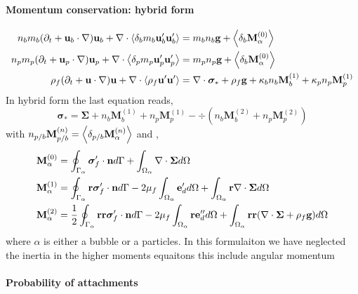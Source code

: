 \documentclass[12pt]{My_preprint}
\begin{document}
\paragraph*{Momentum conservation: hybrid form}
\begin{align}
    n_b m_b (\pddt + \textbf{u}_b\cdot  \grad) \textbf{u}_b
    + \div \pavg[b]{ m_b \textbf{u}_b' \textbf{u}_b'}
    &= 
    m_b n_b \textbf{g}
    + \pavg[b]{\textbf{M}^{(0)}_\alpha}
    \\
    n_p m_p (\pddt + \textbf{u}_p\cdot  \grad) \textbf{u}_p
    + \div \pavg{ m_p \textbf{u}_p' \textbf{u}_p'}
    &= 
    m_p n_p \textbf{g}
    + \pavg[b]{\textbf{M}^{(0)}_\alpha}
    \\
    \rho_f (\pddt + \textbf{u} \cdot \grad)\textbf{u}
    + \div \avg{\rho_f \textbf{u}' \textbf{u}'}
    &= 
    \div \bm\sigma_*
    + \rho_f \textbf{g}
    +\kappa_b   n_b \textbf{M}_b^{(1)}
    +\kappa_p   n_p \textbf{M}_p^{(1)}
\end{align}
In hybrid form the last equation reads, 
\begin{equation}
    \bm\sigma_* 
    =
    \bm\Sigma
    +  n_b \textbf{M}_b^{(1)}
    +  n_p \textbf{M}_p^{(1)}
    -\div (  n_b \textbf{M}_b^{(2)}
    +  n_p \textbf{M}_p^{(2)})
\end{equation}
with $n_{p/b} \textbf{M}_{p/b}^{(n)} = \pavg[p/b]{\textbf{M}_\alpha^{(n)}}$ and , 
\begin{align}
    \textbf{M}_\alpha^{(0)} &=
    \intS{\bm{\sigma}_f' \cdot \textbf{n}}
   +\intO{\div \bm\Sigma}
   \\
   \textbf{M}_\alpha^{(1)} &=
   \intS{\textbf{r}\bm{\sigma}_f' \cdot \textbf{n}}
   -2\mu_f \intO{\textbf{e}_d'}
   +\intO{\textbf{r}\div \bm\Sigma}
   \\
   \textbf{M}_\alpha^{(2)} &=
   \frac{1}{2}\intS{\textbf{rr}\bm{\sigma}_f' \cdot \textbf{n}}
   -2\mu_f \intO{\textbf{re}_d''}
   +\intO{\textbf{rr}(\div \bm\Sigma+ \rho_f\textbf{g})}
    \\
\end{align}
where $\alpha$ is either a bubble or a particles. 
In this formulaiton we have neglected the inertia in the higher moments equaitons this include angular momentum 

\paragraph*{Probability of attachments }
\end{document}
